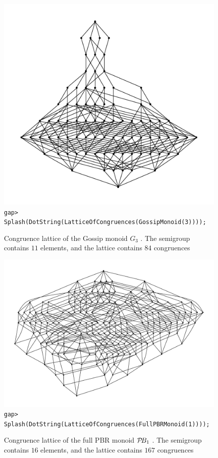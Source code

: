 \begin{figure}[ht]
  \centering
  \includegraphics[width=\textwidth]{pics/ch-lattice/gossip3.pdf}
  \texttt{gap> Splash(DotString(LatticeOfCongruences(GossipMonoid(3))));}
  \caption[Congruence lattice of the Gossip monoid $G_3$]
  {Congruence lattice of the Gossip monoid $G_3$ \cite[\S2]{gossip}.  The
    semigroup contains $11$ elements, and the lattice contains $84$ congruences}
  \label{fig:g3-lattice}
\end{figure}

\begin{figure}[ht]
  \centering
  \includegraphics[width=\textwidth]{pics/ch-lattice/pbr1.pdf}
  \texttt{gap> Splash(DotString(LatticeOfCongruences(FullPBRMonoid(1))));}
  \caption[Congruence lattice of the full PBR monoid $\PBR_1$]
  {Congruence lattice of the full PBR monoid $\PBR_1$
    \cite[\S2.1]{diagram_semigroups}.  The semigroup contains $16$ elements, and
    the lattice contains $167$ congruences}
  \label{fig:pbr1-lattice}
\end{figure}

